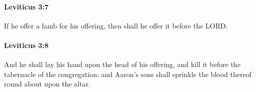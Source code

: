 		\paragraph{Leviticus 3:7} %
			\label{LEVITICUS-3-7}

			If he offer a lamb for his offering, then shall he offer it before the LORD.


		\paragraph{Leviticus 3:8} %
			\label{LEVITICUS-3-8}

			And he shall lay his hand upon the head of his offering, and kill it before the tabernacle of the congregation: and Aaron’s sons shall sprinkle the blood thereof round about upon the altar.



